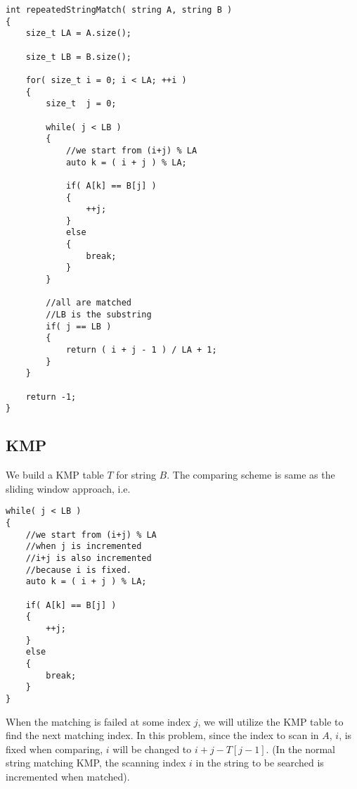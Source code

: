 \setcounter{lstlisting}{0}
\begin{lstlisting}[style=customc, caption={Sliding Window}]
int repeatedStringMatch( string A, string B )
{
    size_t LA = A.size();

    size_t LB = B.size();

    for( size_t i = 0; i < LA; ++i )
    {
        size_t  j = 0;

        while( j < LB )
        {
            //we start from (i+j) % LA
            auto k = ( i + j ) % LA;

            if( A[k] == B[j] )
            {
                ++j;
            }
            else
            {
                break;
            }
        }

        //all are matched
        //LB is the substring
        if( j == LB )
        {
            return ( i + j - 1 ) / LA + 1;
        }
    }

    return -1;
}
\end{lstlisting}

\subsection{KMP}
We build a KMP table $T$ for string $B$. The comparing scheme is same as the sliding window approach, i.e.

\begin{lstlisting}[style=customc, caption={Scanning Scheme}]
while( j < LB )
{
    //we start from (i+j) % LA
    //when j is incremented
    //i+j is also incremented
    //because i is fixed.
    auto k = ( i + j ) % LA;

    if( A[k] == B[j] )
    {
        ++j;
    }
    else
    {
        break;
    }
}
\end{lstlisting}

When the matching is failed at some index $j$, we will utilize the KMP table to find the next matching index. In this problem, since the index to scan in $A$, $i$, is fixed when comparing, $i$ will be changed to $i + j - T[j-1]$. (In the normal string matching KMP, the scanning index $i$ in the string to be searched is incremented when matched).



